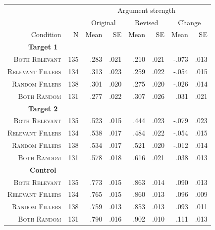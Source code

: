 \documentclass[doc,12pt]{apa}
\newcommand{\relevant}{\textsc{Both Relevant}}
\newcommand{\relevantdata}{\textsc{Relevant Fillers}}
\newcommand{\randomdata}{\textsc{Random Fillers}}
\newcommand{\random}{\textsc{Both Random}}
\begin{document}
\begin{table}[t]
\hspace{-5mm}
\small
\begin{tabular}{rrrrrrrr}
\toprule
 & & \multicolumn{6}{c}{Argument strength} \\
\cmidrule{3-8}
 & & \multicolumn{2}{c}{Original} & \multicolumn{2}{c}{Revised} & \multicolumn{2}{c}{Change} \\
\cmidrule{3-4} \cmidrule{5-6} \cmidrule{7-8}
 Condition & N & Mean & SE & Mean & SE & Mean & SE \\
\midrule
\multicolumn{2}{c}{\bf Target 1} \\
\relevant & 135 & .283 & .021 & .210 & .021 & -.073 & .013 \\
\relevantdata & 134 & .313 & .023 & .259 & .022 & -.054 & .015 \\
\randomdata & 138 & .301 & .020 & .275 & .020 & -.026 & .014 \\
\random & 131 & .277 & .022 & .307 & .026 & .031 & .021 \\
\multicolumn{2}{c}{\bf Target 2} \\
\relevant & 135 & .523 & .015 & .444 & .023 & -.079 & .023 \\
\relevantdata & 134 & .538 & .017 & .484 & .022 & -.054 & .015 \\
\randomdata & 138 & .534 & .017 & .521 & .020 & -.012 & .014 \\
\random & 131 & .578 & .018 & .616 & .021 & .038 & .013 \\
\multicolumn{2}{c}{\bf Control} \\
\relevant & 135 & .773 & .015 & .863 & .014 & .090 & .013 \\
\relevantdata & 134 & .765 & .015 & .860 & .013 & .096 & .009 \\
\randomdata & 138 & .759 & .013 & .853 & .013 & .093 & .011 \\
\random & 131 & .790 & .016 & .902 & .010 & .111 & .013 \\

\end{tabular}
\end{table}
\end{document}
